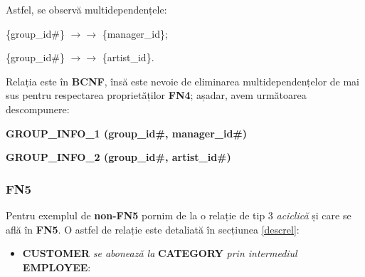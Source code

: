 \documentclass[a4paper, oneside, 12pt]{article}
\begin{document}
\medskip

Astfel, se observă multidependențele:

\begin{m_itemize}
        \item \{group\_id\#\} $\rightarrow\rightarrow$ \{manager\_id\};
        \item \{group\_id\#\} $\rightarrow\rightarrow$ \{artist\_id\}.
\end{m_itemize}

Relația este în \textbf{BCNF}, însă este nevoie de eliminarea
multidependențelor de mai sus pentru respectarea proprietăților \textbf{FN4};
așadar, avem următoarea descompunere:

\begin{m_itemize}
        \item \textbf{GROUP\_INFO\_1 (group\_id\#, manager\_id\#)}
        \item \textbf{GROUP\_INFO\_2 (group\_id\#, artist\_id\#)}
\end{m_itemize}

\subsubsection{\textbf{FN5}}

Pentru exemplul de \textbf{non-FN5} pornim de la o relație de tip 3
\emph{aciclică} și care se află în \textbf{FN5}. O astfel de relație este
detaliată în secțiunea \ref{descrel}:

\begin{itemize}[label=\textbullet, noitemsep, topsep=0pt, after=]

\item \textbf{CUSTOMER} \emph{se abonează la} \textbf{CATEGORY} \emph{prin intermediul} \textbf{EMPLOYEE}:

\end{itemize}
\end{document}
